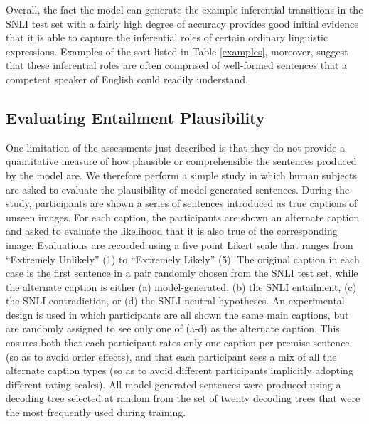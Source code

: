 \documentclass[utf8]{frontiersSCNS} %
\begin{document}
Overall, the fact the model can generate the example inferential transitions in the SNLI test set with a fairly high degree of accuracy provides good initial evidence that it is able to capture the inferential roles of certain ordinary linguistic expressions. Examples of the sort listed in Table \ref{examples}, moreover, suggest that these inferential roles are often comprised of well-formed sentences that a competent speaker of English could readily understand. 

\subsection{Evaluating Entailment Plausibility}

One limitation of the assessments just described is that they do not provide a quantitative measure of how plausible or comprehensible the sentences produced by the model are. We therefore perform a simple study in which human subjects are asked to evaluate the plausibility of model-generated sentences. During the study, participants are shown a series of sentences introduced as true captions of unseen images. For each caption, the participants are shown an alternate caption and asked to evaluate the likelihood that it is also true of the corresponding image. Evaluations are recorded using a five point Likert scale that ranges from ``Extremely Unlikely'' (1) to ``Extremely Likely'' (5). The original caption in each case is the first sentence in a pair randomly chosen from the SNLI test set, while the alternate caption is either (a) model-generated, (b) the SNLI entailment, (c) the SNLI contradiction, or (d) the SNLI neutral hypotheses. An experimental design is used in which participants are all shown the same main captions, but are randomly assigned to see only one of (a-d) as the alternate caption. This ensures both that each participant rates only one caption per premise sentence (so as to avoid order effects), and that each participant sees a mix of all the alternate caption types (so as to avoid different participants implicitly adopting different rating scales). All model-generated sentences were produced using a decoding tree selected at random from the set of twenty decoding trees that were the most frequently used during training. 
\end{document}
